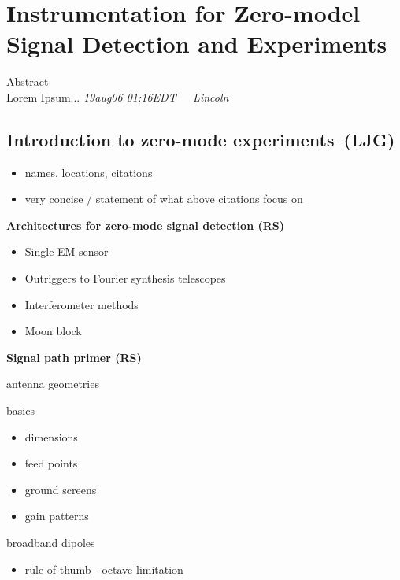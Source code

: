 %
%
\chapter{Instrumentation for Zero-model Signal Detection and Experiments}

\begin{bf}
\author{L. J. Greenhill (Center for Astrophysics), R. Subrahmanyan (Raman Research Institute)}  
  
Abstract\\
Lorem Ipsum...
\emph{19aug06 01:16EDT~~~Lincoln}

\end{bf}


\section{Introduction to zero-mode experiments--(LJG)}

\begin{itemize}
\item
  names, locations, citations
\item
  very concise / statement of what above citations focus on
\end{itemize}

\textbf{Architectures for zero-mode signal detection (RS)}

\begin{itemize}
\item
  Single EM sensor
\item
  Outriggers to Fourier synthesis telescopes
\item
  Interferometer methods
\item
  Moon block
\end{itemize}

\textbf{Signal path primer (RS)}

antenna geometries

basics

\begin{itemize}
\item
  dimensions
\item
  feed points
\item
  ground screens
\item
  gain patterns
\end{itemize}

broadband dipoles

\begin{itemize}
\item
  rule of thumb - octave limitation
\end{itemize}


